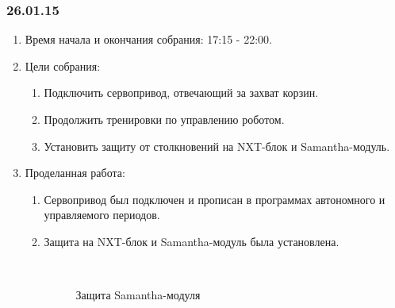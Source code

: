 \subsubsection{26.01.15}
\begin{enumerate}
	
	\item Время начала и окончания собрания: 17:15 - 22:00.
	
	\item Цели собрания: 
	\begin{enumerate}
		
		
		\item Подключить сервопривод, отвечающий за захват корзин.
		
		\item Продолжить тренировки по управлению роботом.
		
        \item Установить защиту от столкновений на NXT-блок и Samantha-модуль.
		
	\end{enumerate}

	\item Проделанная работа:
	\begin{enumerate}
		
		\item Сервопривод был подключен и прописан в программах автономного и управляемого периодов.
		
		\item Защита на NXT-блок и Samantha-модуль была установлена.
		\begin{figure}[H]
		  \begin{minipage}[h]{0.2\linewidth}
			\center  
		  \end{minipage}
		  \begin{minipage}[h]{0.6\linewidth}
			\caption{Защита Samantha-модуля}
		  \end{minipage}
	    \end{figure}
		

\end{enumerate}
\end{enumerate}
